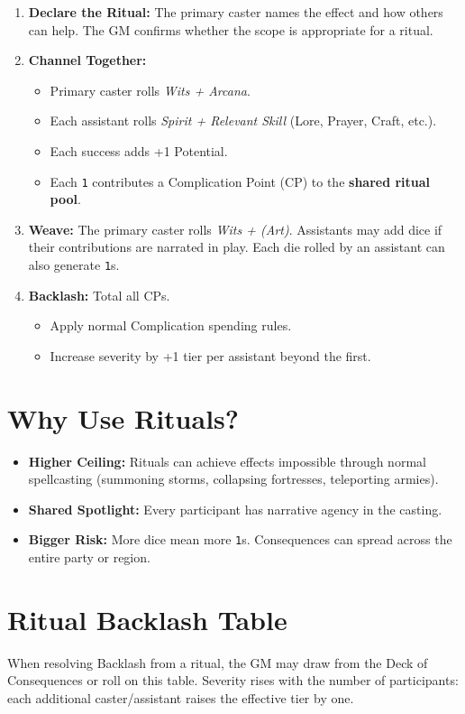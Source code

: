 \documentclass[12pt]{article}
\begin{document}
\begin{enumerate}
  \item \textbf{Declare the Ritual:} The primary caster names the effect and how others can help. The GM confirms whether the scope is appropriate for a ritual. 
  \item \textbf{Channel Together:}
    \begin{itemize}
      \item Primary caster rolls \emph{Wits + Arcana}. 
      \item Each assistant rolls \emph{Spirit + Relevant Skill} (Lore, Prayer, Craft, etc.). 
      \item Each success adds +1 Potential. 
      \item Each \texttt{1} contributes a Complication Point (CP) to the \textbf{shared ritual pool}.
    \end{itemize}
  \item \textbf{Weave:} The primary caster rolls \emph{Wits + (Art)}. Assistants may add dice if their contributions are narrated in play. Each die rolled by an assistant can also generate \texttt{1}s.
  \item \textbf{Backlash:} Total all CPs. 
    \begin{itemize}
      \item Apply normal Complication spending rules. 
      \item Increase severity by +1 tier per assistant beyond the first.
    \end{itemize}
\end{enumerate}

\section*{Why Use Rituals?}
\begin{itemize}
  \item \textbf{Higher Ceiling:} Rituals can achieve effects impossible through normal spellcasting (summoning storms, collapsing fortresses, teleporting armies).
  \item \textbf{Shared Spotlight:} Every participant has narrative agency in the casting. 
  \item \textbf{Bigger Risk:} More dice mean more \texttt{1}s. Consequences can spread across the entire party or region.
\end{itemize}

\section*{Ritual Backlash Table}
When resolving Backlash from a ritual, the GM may draw from the Deck of Consequences or roll on this table.
Severity rises with the number of participants: each additional caster/assistant raises the effective tier by one. 
\end{document}
